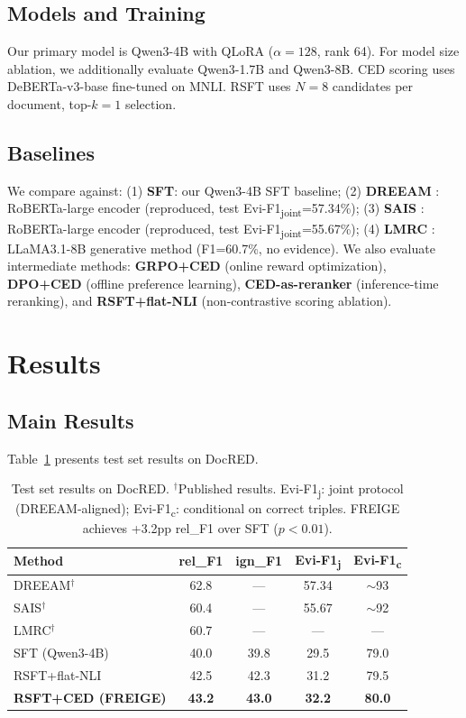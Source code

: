 \documentclass[11pt]{article}
\newcommand{\method}{FREIGE}
\begin{document}
\subsection{Models and Training}

Our primary model is Qwen3-4B with QLoRA ($\alpha{=}128$, rank 64).
For model size ablation, we additionally evaluate Qwen3-1.7B and Qwen3-8B.
CED scoring uses DeBERTa-v3-base fine-tuned on MNLI.
RSFT uses $N{=}8$ candidates per document, top-$k{=}1$ selection.

\subsection{Baselines}

We compare against: (1) \textbf{SFT}: our Qwen3-4B SFT baseline; (2) \textbf{DREEAM} \cite{ma2023dreeam}: RoBERTa-large encoder (reproduced, test Evi-F1\textsubscript{joint}=57.34\%); (3) \textbf{SAIS} \cite{xiao2022sais}: RoBERTa-large encoder (reproduced, test Evi-F1\textsubscript{joint}=55.67\%); (4) \textbf{LMRC} \cite{xu2024lmrc}: LLaMA3.1-8B generative method (F1=60.7\%, no evidence).
We also evaluate intermediate methods: \textbf{GRPO+CED} (online reward optimization), \textbf{DPO+CED} (offline preference learning), \textbf{CED-as-reranker} (inference-time reranking), and \textbf{RSFT+flat-NLI} (non-contrastive scoring ablation).

\section{Results}

\subsection{Main Results}

Table~\ref{tab:main} presents test set results on DocRED.

\begin{table}[t]
\centering
\small
\begin{tabular}{lcccc}
\toprule
\textbf{Method} & \textbf{rel\_F1} & \textbf{ign\_F1} & \textbf{Evi-F1\textsubscript{j}} & \textbf{Evi-F1\textsubscript{c}} \\
\midrule
DREEAM$^\dagger$ & 62.8 & --- & 57.34 & ${\sim}$93 \\
SAIS$^\dagger$ & 60.4 & --- & 55.67 & ${\sim}$92 \\
LMRC$^\dagger$ & 60.7 & --- & --- & --- \\
\midrule
SFT (Qwen3-4B) & 40.0 & 39.8 & 29.5 & 79.0 \\
RSFT+flat-NLI & 42.5 & 42.3 & 31.2 & 79.5 \\
\textbf{RSFT+CED (\method{})} & \textbf{43.2} & \textbf{43.0} & \textbf{32.2} & \textbf{80.0} \\
\bottomrule
\end{tabular}
\caption{Test set results on DocRED. $^\dagger$Published results. Evi-F1\textsubscript{j}: joint protocol (DREEAM-aligned); Evi-F1\textsubscript{c}: conditional on correct triples. \method{} achieves +3.2pp rel\_F1 over SFT ($p{<}0.01$).}
\label{tab:main}
\end{table}
\end{document}

